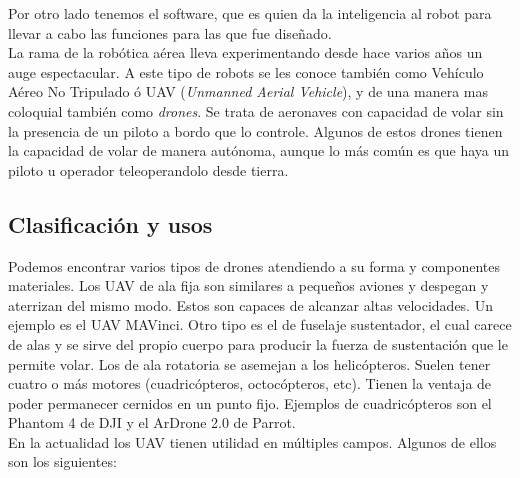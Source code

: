 Por otro lado tenemos el software, que es quien da la inteligencia al robot para llevar a cabo las funciones para las que fue diseñado.\\


La rama de la robótica aérea lleva experimentando desde hace varios años un auge espectacular. A este tipo de robots se les conoce también como Vehículo Aéreo No Tripulado ó UAV (\emph{Unmanned Aerial Vehicle}), y de una manera mas coloquial también como \emph{drones}. Se trata de aeronaves con capacidad de volar sin la presencia de un piloto a bordo que lo controle. Algunos de estos drones tienen la capacidad de volar de manera autónoma, aunque lo más común es que haya un piloto u operador teleoperandolo desde tierra.\\

\subsection{Clasificación y usos}

Podemos encontrar varios tipos de drones atendiendo a su forma y componentes materiales. Los UAV de ala fija son similares a pequeños aviones y despegan y aterrizan del mismo modo. Estos son capaces de alcanzar altas velocidades. Un ejemplo es el UAV MAVinci. Otro tipo es el de fuselaje sustentador, el cual carece de alas y se sirve del propio cuerpo para producir la fuerza de sustentación que le permite volar. Los de ala rotatoria se asemejan a los helicópteros. Suelen tener cuatro o más motores (cuadricópteros, octocópteros, etc). Tienen la ventaja de poder permanecer cernidos en un punto fijo. Ejemplos de cuadricópteros son el Phantom 4 de DJI y el ArDrone 2.0 de Parrot.\\

En la actualidad los UAV tienen utilidad en múltiples campos. Algunos de ellos son los siguientes:

